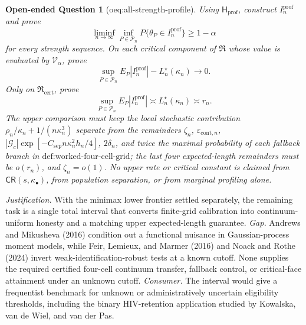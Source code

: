 \documentclass{article}
\newtheorem{openendedquestion}{Open-ended Question}
\begin{document}
\begin{openendedquestion}[oeq:all-strength-profile]\label{oeq:all-strength-profile}
Using \(\mathsf H_{\mathrm{prof}}\), construct \(I_n^{\mathrm{prof}}\)
and prove
\[
 \liminf_{n\to\infty}\inf_{P\in\mathcal P_n}
 P\{\theta_P\in I_n^{\mathrm{prof}}\}\ge1-\alpha
\]
for every strength sequence.  On each critical component of
\(\mathfrak R\) whose value is evaluated by \(\mathcal V_\alpha\), prove
\[
 \sup_{P\in\mathcal P_n}E_P|I_n^{\mathrm{prof}}|
 -L_n^\star(\kappa_n)\longrightarrow0.
\]
Only on \(\mathfrak R_{\mathrm{cert}}\), prove
\[
 \sup_{P\in\mathcal P_n}E_P|I_n^{\mathrm{prof}}|
 \asymp L_n^\star(\kappa_n)\asymp r_n.
\]
The upper comparison must keep the local stochastic contribution
\(\rho_n/\kappa_n+1/(n\kappa_n^3)\) separate from the remainders
\(\zeta_n\), \(\varepsilon_{\mathrm{cont},n}\),
\(|\mathcal G_c|\exp[-C_{\mathrm{sep}}n\kappa_n^2h_n/4]\),
\(2\delta_n\), and twice the maximal probability of each fallback branch
in \(\text{def:worked-four-cell-grid}\); the last four expected-length
remainders must be \(o(r_n)\), and \(\zeta_n=o(1)\).  No upper rate or
critical constant is claimed from \(\mathsf{CR}(s,\kappa_\bullet)\), from
population separation, or from marginal profiling alone.
\end{openendedquestion}
\par\smallskip\noindent \textit{Justification.} With the minimax lower frontier settled separately, the remaining task is a single total interval that converts finite-grid calibration into continuum-uniform honesty and a matching upper expected-length guarantee. \textit{Gap.} Andrews and Mikusheva (2016) condition out a functional nuisance in Gaussian-process moment models, while Feir, Lemieux, and Marmer (2016) and Noack and Rothe (2024) invert weak-identification-robust tests at a known cutoff. None supplies the required certified four-cell continuum transfer, fallback control, or critical-face attainment under an unknown cutoff. \textit{Consumer.} The interval would give a frequentist benchmark for unknown or administratively uncertain eligibility thresholds, including the binary HIV-retention application studied by Kowalska, van de Wiel, and van der Pas.
\end{document}

